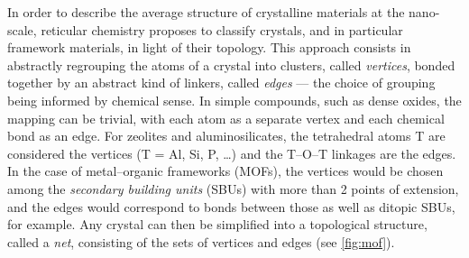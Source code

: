 \documentclass[main.tex]{subfiles}
\begin{document}
In order to describe the average structure of crystalline materials at the nano-scale, reticular chemistry \autocite{reticularChemistry, reticularSynthesis} proposes to classify crystals, and in particular framework materials, in light of their topology. This approach consists in abstractly regrouping the atoms of a crystal into clusters, called \emph{vertices}, bonded together by an abstract kind of linkers, called \emph{edges} --- the choice of grouping being informed by chemical sense. In simple compounds, such as dense oxides, the mapping can be trivial, with each atom as a separate vertex and each chemical bond as an edge. For zeolites and aluminosilicates, the tetrahedral atoms T are considered the vertices (T = Al, Si, P, \ldots) and the T--O--T linkages are the edges. In the case of metal--organic frameworks (MOFs), the vertices would be chosen among the \emph{secondary building units} (SBUs) \autocite{SBUs} with more than 2 points of extension, and the edges would correspond to bonds between those as well as ditopic SBUs, for example. Any crystal can then be simplified into a topological structure, called a \emph{net}, consisting of the sets of vertices and edges (see \autoref{fig:mof}).
\end{document}
